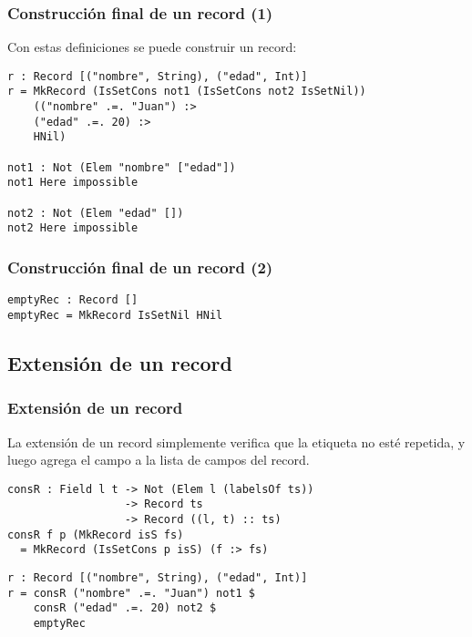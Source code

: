 \documentclass{beamer}
\begin{document}
\begin{frame}[fragile]
\frametitle{Construcción final de un record (1)}

Con estas definiciones se puede construir un record:

\begin{example}
\begin{verbatim}
r : Record [("nombre", String), ("edad", Int)]
r = MkRecord (IsSetCons not1 (IsSetCons not2 IsSetNil)) 
    (("nombre" .=. "Juan") :>
    ("edad" .=. 20) :>
    HNil)

not1 : Not (Elem "nombre" ["edad"])
not1 Here impossible

not2 : Not (Elem "edad" [])
not2 Here impossible
\end{verbatim}
\end{example}
\end{frame}

\begin{frame}[fragile]
\frametitle{Construcción final de un record (2)}

\begin{example}
\begin{verbatim}
emptyRec : Record []
emptyRec = MkRecord IsSetNil HNil
\end{verbatim}
\end{example}

\end{frame}

\subsection{Extensión de un record}

\begin{frame}[fragile]
\frametitle{Extensión de un record}

La extensión de un record simplemente verifica que la etiqueta no esté repetida, y luego agrega el campo a la lista de campos del record.

\pause

\begin{example}
\begin{verbatim}
consR : Field l t -> Not (Elem l (labelsOf ts))
                  -> Record ts
                  -> Record ((l, t) :: ts)
consR f p (MkRecord isS fs)
  = MkRecord (IsSetCons p isS) (f :> fs)
\end{verbatim}
\end{example}

\pause
\begin{example}
\begin{verbatim}
r : Record [("nombre", String), ("edad", Int)]
r = consR ("nombre" .=. "Juan") not1 $
    consR ("edad" .=. 20) not2 $
    emptyRec
\end{verbatim}
\end{example}
\end{frame}
\end{document}

